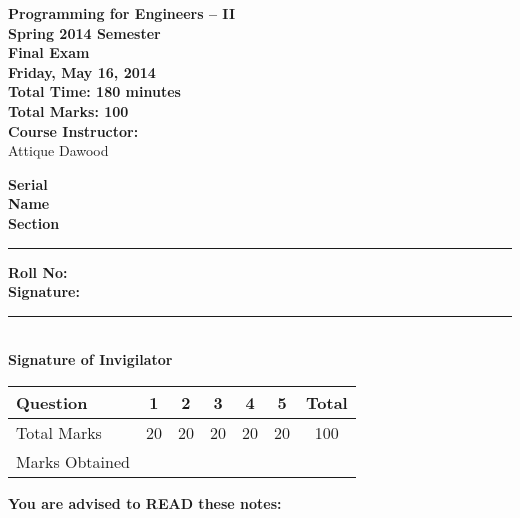 \documentclass[12pt,a4paper]{article}
\def\QOne{20}
\def\Qtwo{20}
\def\Qthree{20}
\def\Qfour{20}
\def\Qfive{20}
\def\TotalMarks{100}
\begin{document}
\begin{minipage}{0.55\textwidth}
{\LARGE \textbf{Programming for Engineers -- II}}\\[0.15cm]
{\normalsize \textbf{Spring 2014 Semester}}\\
{\Large \textbf{Final Exam}}\\
{\normalsize \textbf{Friday, May 16, 2014}}\\[0.30cm]
{\Large \textbf{Total Time: 180 minutes}}\\[0.15cm]
{\Large \textbf{Total Marks: 100}}\\
\textbf{Course Instructor:}\\
Attique Dawood\\
\end{minipage}
\begin{minipage}{0.4\textwidth}
\textbf{Serial} \hrulefill \\[0.25cm]
\textbf{Name} \hrulefill\\[0.25cm]
\textbf{Section} \rule{1cm}{0.2mm} \textbf{Roll No:} \hrulefill\\[0.25cm]
\textbf{Signature:} \hrulefill\\[0.25cm]
\rule{6.6cm}{0.2mm}\\
\textbf{Signature of Invigilator}\\[0.25cm]
\end{minipage}
\begin{table}[H]
\begin{center}
\vspace{0.3cm}
	{\large \begin{tabular}{|l|c|c|c|c|c|c|}
	\hline
		\rule{0pt}{2.6ex} Question & \textbf{1} & \textbf{2} & \textbf{3} & \textbf{4} & \textbf{5} & \textbf{Total}\\
		\hline
		Total Marks \rule{0pt}{2.6ex} & \QOne & \Qtwo & \Qthree & \Qfour & \Qfive & \TotalMarks\\
		\hline
		Marks Obtained \rule{0pt}{2.6ex} & & & & & &\\
	\hline
	\end{tabular}}
\end{center}
\end{table}
\noindent \textbf{You are advised to READ these notes:}
\end{document}
